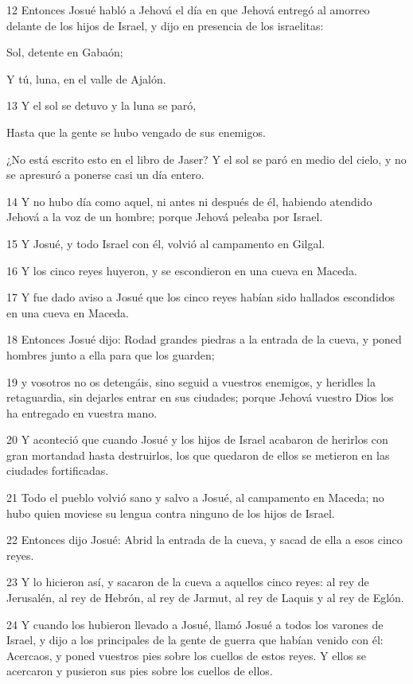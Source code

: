\par 12 Entonces Josué habló a Jehová el día en que Jehová entregó al amorreo delante de los hijos de Israel, y dijo en presencia de los israelitas:
\par Sol, detente en Gabaón;
\par Y tú, luna, en el valle de Ajalón. 
\par 13 Y el sol se detuvo y la luna se paró,
\par Hasta que la gente se hubo vengado de sus enemigos.
\par ¿No está escrito esto en el libro de Jaser? Y el sol se paró en medio del cielo, y no se apresuró a ponerse casi un día entero.
\par 14 Y no hubo día como aquel, ni antes ni después de él, habiendo atendido Jehová a la voz de un hombre; porque Jehová peleaba por Israel.
\par 15 Y Josué, y todo Israel con él, volvió al campamento en Gilgal.
\par 16 Y los cinco reyes huyeron, y se escondieron en una cueva en Maceda.
\par 17 Y fue dado aviso a Josué que los cinco reyes habían sido hallados escondidos en una cueva en Maceda.
\par 18 Entonces Josué dijo: Rodad grandes piedras a la entrada de la cueva, y poned hombres junto a ella para que los guarden;
\par 19 y vosotros no os detengáis, sino seguid a vuestros enemigos, y heridles la retaguardia, sin dejarles entrar en sus ciudades; porque Jehová vuestro Dios los ha entregado en vuestra mano.
\par 20 Y aconteció que cuando Josué y los hijos de Israel acabaron de herirlos con gran mortandad hasta destruirlos, los que quedaron de ellos se metieron en las ciudades fortificadas.
\par 21 Todo el pueblo volvió sano y salvo a Josué, al campamento en Maceda; no hubo quien moviese su lengua contra ninguno de los hijos de Israel.
\par 22 Entonces dijo Josué: Abrid la entrada de la cueva, y sacad de ella a esos cinco reyes.
\par 23 Y lo hicieron así, y sacaron de la cueva a aquellos cinco reyes: al rey de Jerusalén, al rey de Hebrón, al rey de Jarmut, al rey de Laquis y al rey de Eglón.
\par 24 Y cuando los hubieron llevado a Josué, llamó Josué a todos los varones de Israel, y dijo a los principales de la gente de guerra que habían venido con él: Acercaos, y poned vuestros pies sobre los cuellos de estos reyes. Y ellos se acercaron y pusieron sus pies sobre los cuellos de ellos.

